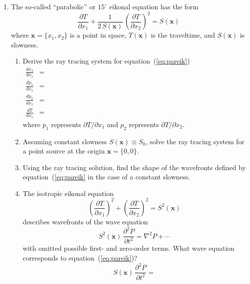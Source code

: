 \begin{enumerate}
\item The so-called ``parabolic'' or $15^{\circ}$ eikonal
  equation \cite[]{tappert,iei,bamberger} has the form
  \begin{equation}
    \label{eq:pareik}
    \frac{\partial T}{\partial x_1} + \frac{1}{2\,S(\mathbf{x})}\,\left(\frac{\partial T}{\partial x_2}\right)^2 =
    S(\mathbf{x})
  \end{equation}
  where $\mathbf{x}=\{x_1,x_2\}$ is a point in space, $T(\mathbf{x})$
  is the traveltime, and $S(\mathbf{x})$ is slowness. 
  \begin{enumerate}
  \item Derive the ray tracing system for equation~(\ref{eq:pareik})
    \begin{eqnarray}
      \label{eq:xt}
      \frac{d x_2}{d x_1} & = & \hspace{5in} \\
      \label{eq:pxt}
      \frac{d p_1}{d x_1} & = & \\
      \label{eq:pzt}
      \frac{d p_2}{d x_1} & = & \\
      \label{eq:tt}
      \frac{d T}{d x_1} & = &
    \end{eqnarray}
    where $p_1$ represents $\partial T/\partial x_1$ and 
    $p_2$ represents $\partial T/\partial x_2$.
  \item Assuming constant slowness $S(\mathbf{x}) \equiv S_0$, solve
    the ray tracing system for a point source at the origin
    $\mathbf{x} = \{0,0\}$.
  \item Using the ray tracing solution, find the shape of the
    wavefronts defined by equation~(\ref{eq:pareik} in the case of a
    constant slowness.
  \item The isotropic eikonal equation
    \begin{equation}
      \label{eq:iso}
      \left(\frac{\partial T}{\partial x_1}\right)^2 +
      \left(\frac{\partial T}{\partial x_2}\right)^2 = S^2(\mathbf{x})
    \end{equation}
    describes wavefronts of the wave equation
    \begin{equation}
      \label{eq:isowave}
      S^2(\mathbf{x})\,\frac{\partial^2 P}{\partial t^2} =
      \nabla^2 P + \cdots
    \end{equation}
    with omitted possible first- and zero-order terms. 
    What wave equation corresponds to equation~(\ref{eq:pareik})?
    \begin{equation}
      S(\mathbf{x})\,{\frac{\partial^2 P}{\partial t^2}} =
      \label{eq:parwave}
    \end{equation}
  \end{enumerate}
\end{enumerate}

